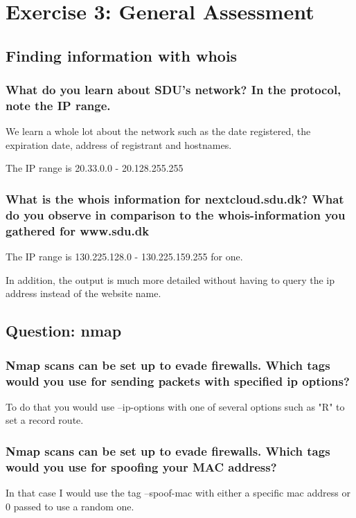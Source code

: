 \section{Exercise 3: General Assessment}

\subsection{Finding information with whois}

\subsubsection{What do you learn about SDU's network? In the protocol, note the IP range.}
We learn a whole lot about the network such as the date registered, the expiration date, address of registrant and hostnames.


The IP range is 20.33.0.0 - 20.128.255.255

\subsubsection{What is the whois information for nextcloud.sdu.dk? What do you observe in comparison to the whois-information you gathered for www.sdu.dk}


The IP range is 130.225.128.0 - 130.225.159.255 for one.

In addition, the output is much more detailed without having to query the ip address instead of the website name.

\subsection{Question: nmap}
\subsubsection{Nmap scans can be set up to evade firewalls. Which tags would you use for sending packets with specified ip options?}
To do that you would use --ip-options with one of several options such as "R" to set a record route.
\subsubsection{Nmap scans can be set up to evade firewalls. Which tags would you use for spoofing your MAC address?}
In that case I would use the tag --spoof-mac with either a specific mac address or 0 passed to use a random one.

